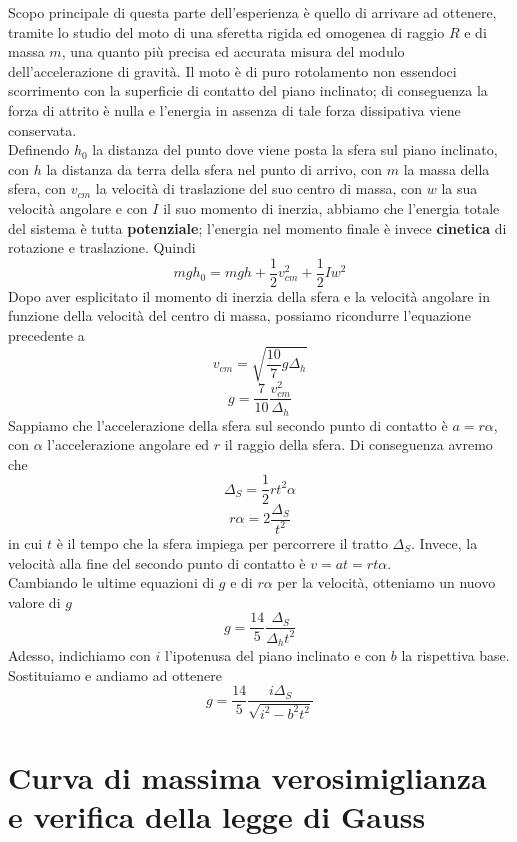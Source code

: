 \documentclass[a4paper, 12pt]{article} %
\begin{document}
Scopo principale di questa parte dell'esperienza è quello di arrivare ad ottenere, tramite lo studio del moto di una sferetta rigida ed omogenea di raggio $R$ e di massa $m$, una quanto più precisa ed accurata misura del modulo dell'accelerazione di gravità.
Il moto è di puro rotolamento non essendoci scorrimento con la superficie di contatto del piano inclinato; di conseguenza la forza di attrito è nulla e l'energia in assenza di tale forza dissipativa viene conservata.\\
Definendo $h_{0}$ la distanza del punto dove viene posta la sfera sul piano inclinato, con $h$ la distanza da terra della sfera nel punto di arrivo, con $m$ la massa della sfera, con $v_{cm}$ la velocità di traslazione del suo centro di massa, con $w$ la sua velocità angolare e con $I$ il suo momento di inerzia, abbiamo che l'energia totale del sistema è tutta \textbf{potenziale}; l'energia nel momento finale è invece \textbf{cinetica} di rotazione e traslazione.
Quindi
$$mgh_{0}=mgh+\dfrac{1}{2}v^{2}_{cm}+\dfrac{1}{2}Iw^{2}$$
Dopo aver esplicitato il momento di inerzia della sfera e la velocità angolare in funzione della velocità del centro di massa, possiamo ricondurre l'equazione precedente a 
$$v_{cm}=\sqrt{\dfrac{10}{7}g\Delta_{h}}$$
$$g=\dfrac{7}{10}\dfrac{v^{2}_{cm}}{\Delta_{h}}$$
Sappiamo che l'accelerazione della sfera sul secondo punto di contatto è $a=r\alpha$, con $\alpha$ l'accelerazione angolare ed $r$ il raggio della sfera.
Di conseguenza avremo che
$$\Delta_{S}=\dfrac{1}{2}rt^{2}\alpha$$ 
$$r\alpha=2\dfrac{\Delta_{S}}{t^{2}}$$
in cui $t$ è il tempo che la sfera impiega per percorrere il tratto $\Delta_{S}$. Invece, la velocità alla fine del secondo punto di contatto è $v=at=rt\alpha$.\\
Cambiando le ultime equazioni di $g$ e di $r\alpha$ per la velocità, otteniamo un nuovo valore di $g$
$$g=\dfrac{14}{5}\dfrac{\Delta_{S}}{\Delta_{h}t^{2}}$$
Adesso, indichiamo con $i$ l'ipotenusa del piano inclinato e con $b$ la rispettiva base. Sostituiamo e andiamo ad ottenere
$$g=\dfrac{14}{5}\dfrac{i\Delta_{S}}{\sqrt{i^{2}-b^{2}t^{2}}}$$


\section{Curva di massima verosimiglianza e verifica della legge di Gauss}
\end{document}
